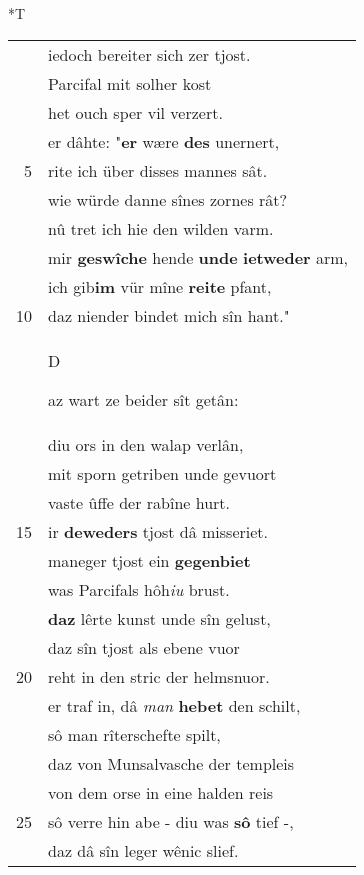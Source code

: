 \documentclass[8pt,a4paper,notitlepage]{article}
\begin{document}
\begin{table}[ht]
\begin{minipage}[t]{0.5\linewidth}
\end{minipage}
\hspace{0.5cm}
\begin{minipage}[t]{0.5\linewidth}
\small
\begin{center}*T
\end{center}
\begin{tabular}{rl}
 & iedoch bereiter sich zer tjost.\\ 
 & Parcifal mit solher kost\\ 
 & het ouch sper vil verzert.\\ 
 & er dâhte: "\textbf{er} wære \textbf{des} unernert,\\ 
5 & rite ich über disses mannes sât.\\ 
 & wie würde danne sînes zornes rât?\\ 
 & nû tret ich hie den wilden varm.\\ 
 & mir \textbf{geswîche} hende \textbf{unde} \textbf{ietweder} arm,\\ 
 & ich gib\textbf{im} vür mîne \textbf{reite} pfant,\\ 
10 & daz niender bindet mich sîn hant."\\ 
 & \begin{large}D\end{large}az wart ze beider sît getân:\\ 
 & diu ors in den walap verlân,\\ 
 & mit sporn getriben unde gevuort\\ 
 & vaste ûffe der rabîne hurt.\\ 
15 & ir \textbf{deweders} tjost dâ misseriet.\\ 
 & maneger tjost ein \textbf{gegenbiet}\\ 
 & was Parcifals hôh\textit{iu} brust.\\ 
 & \textbf{daz} lêrte kunst unde sîn gelust,\\ 
 & daz sîn tjost als ebene vuor\\ 
20 & reht in den stric der helmsnuor.\\ 
 & er traf in, dâ \textit{man} \textbf{hebet} den schilt,\\ 
 & sô man rîterschefte spilt,\\ 
 & daz von Munsalvasche der templeis\\ 
 & von dem orse in eine halden reis\\ 
25 & sô verre hin abe - diu was \textbf{sô} tief -,\\ 
 & daz dâ sîn leger wênic slief.\\ 

\end{tabular}
\end{minipage}
\end{table}
\end{document}
